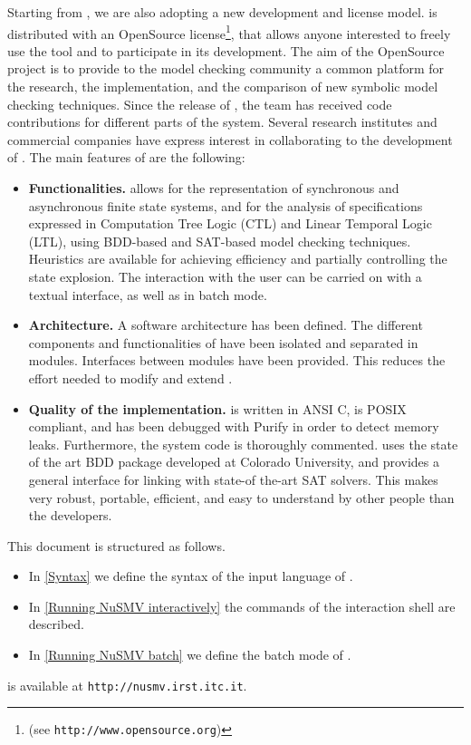Starting from \nusmvTwo, we are also adopting a new development and
license model. \nusmvTwo is distributed with an OpenSource
license\footnote{(see \texttt{http://www.opensource.org})}, that
allows anyone interested to freely use the tool and to participate in
its development. The aim of the \nusmv OpenSource project is to
provide to the model checking community a common platform for the
research, the implementation, and the comparison of new symbolic model
checking techniques. Since the release of \nusmvTwo, the \nusmv team
has received code contributions for different parts of the system.
Several research institutes and commercial companies have express
interest in collaborating to the development of \nusmv. The main
features of \nusmv are the following:
\begin{itemize}
\item {\bf Functionalities.}
\nusmv allows for the representation of synchronous and
asynchronous finite state systems, and for the analysis of
specifications expressed in Computation Tree Logic (CTL) and Linear
Temporal Logic (LTL), using BDD-based and SAT-based model checking techniques.
Heuristics are available for achieving efficiency and partially
controlling the state explosion.  The interaction with the user can be
carried on with a textual interface, as well as in batch mode.
\item{\bf Architecture.}
A software architecture has been defined. The different components and
functionalities of \nusmv have been isolated and separated in
modules. Interfaces between modules have been provided. This 
reduces the effort needed to modify and extend \nusmv.
\item{\bf Quality of the implementation.}
\nusmv is written in ANSI C, is POSIX compliant, and has been
debugged with Purify in order to detect memory leaks. Furthermore, the
system code is thoroughly commented. \nusmv uses the state of the
art BDD package developed at Colorado University, and provides a general
interface for linking with state-of the-art SAT solvers. This makes
\nusmv very robust, portable, efficient, and easy to
understand by other people than the developers.
\end{itemize}
This document is structured as follows.
\begin{itemize}
\item In \cref{Syntax} we define the syntax of the input language of
\nusmv.
\item In \cref{Running NuSMV interactively} the commands of the
interaction shell are described.
\item In \cref{Running NuSMV batch}
we define the batch mode of \nusmv.
\end{itemize}
\nusmv is available at \texttt{http://nusmv.irst.itc.it}.
